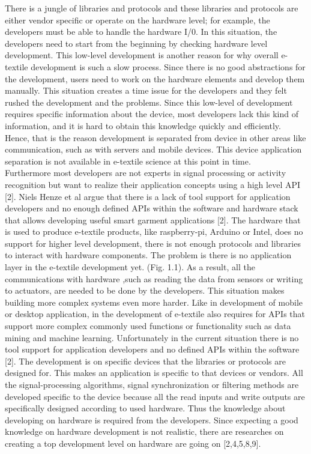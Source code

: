 There is a jungle of libraries and protocols and these libraries and protocols are either vendor specific or operate on the hardware level; for example, the developers must be able to handle the hardware I/0. In this situation, the developers need to start from the beginning by checking hardware level development. This low-level development is another reason for why overall e-textile development is such a slow process. Since there is no good abstractions for the development, users need to work on the hardware elements and develop them manually. This situation creates a time issue for the developers and they felt rushed the development and the problems. Since this low-level of development requires specific information about the device, most developers lack this kind of information, and it is hard to obtain this knowledge quickly and efficiently. Hence, that is the reason development is separated from device in other areas like communication, such as with servers and mobile devices. This device application separation is not available in e-textile science at this point in time.  	\\
	
	Furthermore most developers are not experts in signal processing or activity recognition but want to realize their application concepts using a high level API [2]. Niels Henze et al argue that there is a lack of tool support for application developers and no enough defined APIs within the software and hardware stack that allows developing useful smart garment applications [2]. The hardware that is used to produce e-textile products, like raspberry-pi, Arduino or Intel, does no support for higher level development, there is not enough protocols and libraries to interact with hardware components. The problem is there is no application layer in the e-textile development yet. (Fig. 1.1). As a result, all the communications with hardware ,such as reading the data from sensors or writing to actuators, are needed to be done by the developers. This situation makes building more complex systems even more harder. Like in development of mobile or desktop application, in the development of e-textile also requires for APIs that support more complex commonly used functions or functionality such as data mining and machine learning. Unfortunately in the current situation there is no tool support for application developers and no defined APIs within the software [2]. The development is on specific devices that the libraries or protocols are designed for. This makes an application is specific to that devices or vendors. All the signal-processing algorithms, signal synchronization or filtering methods are developed specific to the device because all the read inputs and write outputs are specifically designed according to used hardware. Thus the knowledge about developing on hardware is required from the developers. Since expecting a good knowledge on hardware development is not realistic, there are researches on creating a top development level on hardware are going on [2,4,5,8,9]. \\

